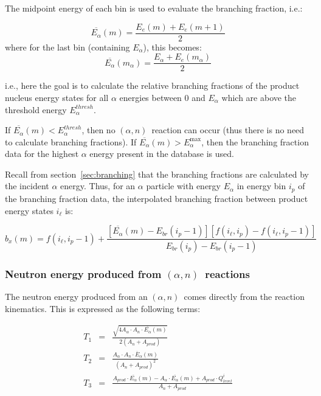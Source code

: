 \documentclass[10pt]{article}
\newcommand{\alphn}[0]{$\left(\alpha,n\right)$}
\begin{document}
The midpoint energy of each bin is used to evaluate the branching fraction, i.e.:

\begin{equation}
\overline{E_\alpha}\left(m\right) = \frac{E_e\left(m\right) + E_e\left(m+1\right)}{2}
\end{equation}
where for the last bin (containing $E_\alpha$), this becomes:
\begin{equation}
\overline{E_\alpha}\left(m_\alpha\right) = \frac{E_\alpha + E_e\left(m_\alpha\right)}{2}
\end{equation}

i.e., here the goal is to calculate the relative branching fractions of the product nucleus energy states for all $\alpha$ energies between 0 and $E_\alpha$ which are above the threshold energy $E_\alpha^{thresh}$.

If $\overline{E_\alpha}\left(m\right)<E_\alpha^{thresh}$, then no \alphn\ reaction can occur (thus there is no need to calculate branching fractions). If $\overline{E_\alpha}\left(m\right) > E_\alpha^{\max}$, then the branching fraction data for the highest $\alpha$ energy present in the database is used.

Recall from section~\ref{sec:branching} that the branching fractions are calculated by the incident $\alpha$ energy. Thus, for an $\alpha$ particle with energy $E_\alpha$ in energy bin $i_p$ of the branching fraction data, the interpolated branching fraction between product energy states $i_\ell$ is:

\begin{equation}
\displaystyle b_x \left( m \right) = f\left(i_\ell, i_p-1\right) + \frac{ \left[ \overline{E_\alpha} \left(m\right) - E_{br} \left( i_p-1 \right) \right] \left[ f\left( i_\ell, i_p\right) - f\left(i_\ell, i_p-1\right) \right] }{ E_{br}\left(i_p \right) - E_{br}\left(i_p-1\right) }
\end{equation}


\subsubsection{Neutron energy produced from \alphn\ reactions}

The neutron energy produced from an \alphn\ comes directly from the reaction kinematics. This is expressed as the following terms:

\begin{eqnarray}
T_1 & = & \frac{\sqrt{4 A_\alpha \cdot A_n \cdot \overline{E_{\alpha}} \left(m \right)}}{2 \left(A_n + A_{prod} \right) } \\
T_2 & = & \frac{A_\alpha \cdot A_n \cdot \overline{E}_{\alpha}\left(m \right)}{\left(A_n + A_{prod} \right)^2 } \\
T_3 & = & \frac{ A_{prod} \cdot \overline{E_{\alpha}} \left( m \right) - A_\alpha \cdot \overline{E_{\alpha}}\left(m \right)    + A_{prod}   \cdot Q_{level}^i }{A_n + A_{prod}}
\end{eqnarray}
\end{document}
